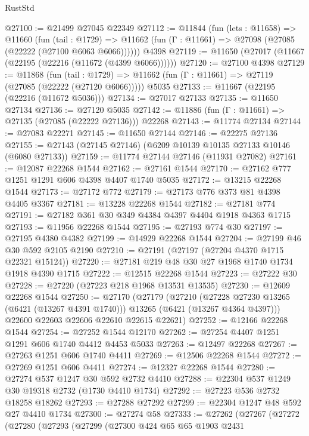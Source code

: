 \begin{lexlean}{RustStd}
\begin{coremodule}
@27100 := @21499 @27045 @22349
@27112 := @11844
    (fun (lets : @11658) =>
    @11660
      (fun (tail : @1729) =>
      @11662 (fun (Γ : @11661) => @27098 (@27085 (@22222 (@27100 @6063 @6066))))))
    @4398
@27119 := @11650 (@27017 (@11667 (@22195 (@22216 (@11672 (@4399 @6066))))))
@27120 := @27100 @4398
@27129 := @11868
    (fun (tail : @1729) => @11662 (fun (Γ : @11661) => @27119 (@27085 (@22222 (@27120 @6066)))))
    @5035
@27133 := @11667 (@22195 (@22216 (@11672 @5036)))
@27134 := @27017 @27133
@27135 := @11650 @27134
@27136 := @27120 @5035
@27142 := @11886 (fun (Γ : @11661) => @27135 (@27085 (@22222 @27136))) @22268
@27143 := @11774 @27134
@27144 := @27083 @22271
@27145 := @11650 @27144
@27146 := @22275 @27136
@27155 := @27143 (@27145 @27146) (@6209 @10139 @10135 @27133 @10146 (@6080 @27133))
@27159 := @11774 @27144 @27146 (@11931 @27082)
@27161 := @12087 @22268 @1544
@27162 := @27161 @1544
@27170 := @27162 @777 @1251 @1291 @606 @4398 @4407 @1740 @5035
@27172 := @13215 @22268 @1544
@27173 := @27172 @772
@27179 := @27173 @776 @373 @81 @4398 @4405 @3367
@27181 := @13228 @22268 @1544
@27182 := @27181 @774
@27191 := @27182 @361 @30 @349 @4384 @4397 @4404 @1918 @4363 @1715
@27193 := @11956 @22268 @1544
@27195 := @27193 @774 @30
@27197 := @27195 @4380 @4382
@27199 := @14929 @22268 @1544
@27204 := @27199 @46 @30 @592 @2105 @2190
@27210 := @27191 (@27197 (@27204 @4370 @1715 @22321 @15124))
@27220 := @27181 @219 @48 @30 @27 @1968 @1740 @1734 @1918 @4390 @1715
@27222 := @12515 @22268 @1544
@27223 := @27222 @30
@27228 := @27220 (@27223 @218 @1968 @13531 @13535)
@27230 := @12609 @22268 @1544
@27250 := @27170
    (@27179
      (@27210
        (@27228 @27230 @13265 (@6421 (@13267 @4391 @1740)))
        @13265
        (@6421 (@13267 @4364 @4397)))
      @22600
      @22603
      @22606
      @22610
      @22615
      @22621)
@27252 := @12166 @22268 @1544
@27254 := @27252 @1544 @12170
@27262 := @27254 @4407 @1251 @1291 @606 @1740 @4412 @4453 @5033
@27263 := @12497 @22268
@27267 := @27263 @1251 @606 @1740 @4411
@27269 := @12506 @22268 @1544
@27272 := @27269 @1251 @606 @4411
@27274 := @12327 @22268 @1544
@27280 := @27274 @537 @1247 @30 @592 @2732 @4410
@27288 := @22304 @537 @1249 @30 @19318 @2732 (@1730 @4410 @1734)
@27292 := @27223 @536 @2732 @18258 @18262
@27293 := @27288 @27292
@27299 := @22304 @1247 @48 @592 @27 @4410 @1734
@27300 := @27274 @58
@27333 := @27262
    (@27267
      (@27272
        (@27280
          (@27293
            (@27299
              (@27300
                @424
                @65
                @65
                @1903
                @2431

\end{coremodule}
\end{lexlean}
